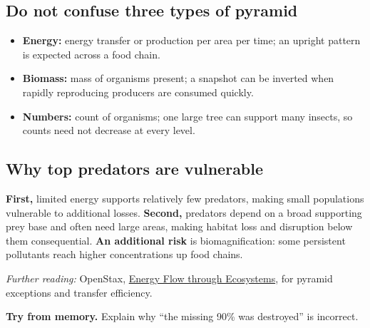 \documentclass[11pt,letterpaper]{article}
\newcommand{\memorycheck}[1]{\par\smallskip\textbf{Try from memory.} #1\par}
\newcommand{\source}[1]{{\footnotesize\textit{Further reading:} #1\par}}
\begin{document}
\subsection*{Do not confuse three types of pyramid}
\begin{itemize}
\item \textbf{Energy:} energy transfer or production per area per time; an upright pattern is expected across a food chain.
\item \textbf{Biomass:} mass of organisms present; a snapshot can be inverted when rapidly reproducing producers are consumed quickly.
\item \textbf{Numbers:} count of organisms; one large tree can support many insects, so counts need not decrease at every level.
\end{itemize}
\subsection*{Why top predators are vulnerable}
\textbf{First,} limited energy supports relatively few predators, making small populations vulnerable to additional losses. \textbf{Second,} predators depend on a broad supporting prey base and often need large areas, making habitat loss and disruption below them consequential. \textbf{An additional risk} is biomagnification: some persistent pollutants reach higher concentrations up food chains.
\source{OpenStax, \href{https://openstax.org/books/biology-2e/pages/46-2-energy-flow-through-ecosystems}{Energy Flow through Ecosystems}, for pyramid exceptions and transfer efficiency.}
\memorycheck{Explain why ``the missing 90\% was destroyed'' is incorrect.}
\end{document}
